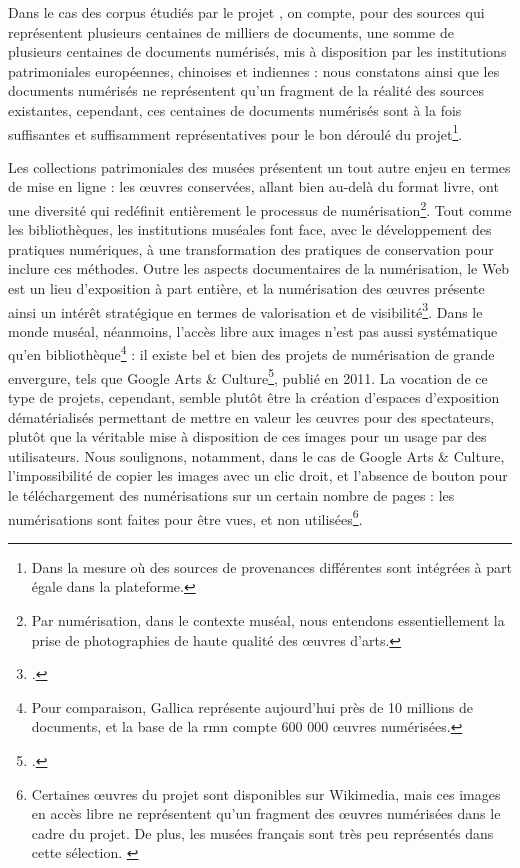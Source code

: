 	Dans le cas des corpus étudiés par le projet \eida, on compte, pour des sources qui représentent plusieurs centaines de milliers de documents, une somme de plusieurs centaines de documents numérisés, mis à disposition par les institutions patrimoniales européennes, chinoises et indiennes : nous constatons ainsi que les documents numérisés ne représentent qu'un fragment de la réalité des sources existantes, cependant, ces centaines de documents numérisés sont à la fois suffisantes et suffisamment représentatives pour le bon déroulé du projet\footnote{Dans la mesure où des sources de provenances différentes sont intégrées à part égale dans la plateforme.}.
	
	Les collections patrimoniales des musées présentent un tout autre enjeu en termes de mise en ligne : les œuvres conservées, allant bien au-delà du format livre, ont une diversité qui redéfinit entièrement le processus de numérisation\footnote{Par numérisation, dans le contexte muséal, nous entendons essentiellement la prise de photographies de haute qualité des œuvres d'arts.}. Tout comme les bibliothèques, les institutions muséales font face, avec le développement des pratiques numériques, à une transformation des pratiques de conservation pour inclure ces méthodes. Outre les aspects documentaires de la numérisation, le Web est un lieu d'exposition à part entière, et la numérisation des œuvres présente ainsi un intérêt stratégique en termes de valorisation et de visibilité\footcite{baujardNumerisationPatrimoineCulturel2017}. Dans le monde muséal, néanmoins, l'accès libre aux images n'est pas aussi systématique qu'en bibliothèque\footnote{Pour comparaison, Gallica représente aujourd'hui près de 10 millions de documents, et la base de la \acrfull{rmn} compte 600 000 œuvres numérisées.} : il existe bel et bien des projets de numérisation de grande envergure, tels que Google Arts \& Culture\footcite{GoogleArtsCulture}, publié en 2011. La vocation de ce type de projets, cependant, semble plutôt être la création d'espaces d'exposition dématérialisés permettant de mettre en valeur les œuvres pour des spectateurs, plutôt que la véritable mise à disposition de ces images pour un usage par des utilisateurs. Nous soulignons, notamment, dans le cas de Google Arts \& Culture, l'impossibilité de copier les images avec un clic droit, et l'absence de bouton pour le téléchargement des numérisations sur un certain nombre de pages : les numérisations sont faites pour être vues, et non utilisées\footnote{Certaines œuvres du projet sont disponibles sur Wikimedia, mais ces images en accès libre ne représentent qu'un fragment des œuvres numérisées dans le cadre du projet. De plus, les musées français sont très peu représentés dans cette sélection. \cite{CategoryGoogleArt}}. 
	
